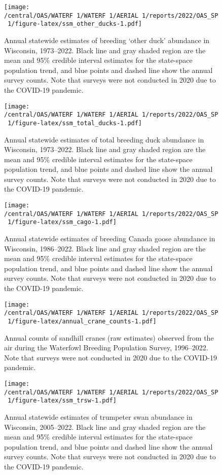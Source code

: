 \documentclass[
  12pt,
]{article}
\begin{document}
\newpage

\begin{figure}
\centering
\texttt{[image: /central/OAS/WATERF~1/WATERF~1/AERIAL~1/reports/2022/OAS\_SP~1/figure-latex/ssm\_other\_ducks-1.pdf]}
\caption{\label{fig:ssm_other_ducks}Annual statewide estimates of
breeding `other duck' abundance in Wisconsin, 1973--2022. Black line and
gray shaded region are the mean and 95\% credible interval estimates for
the state-space population trend, and blue points and dashed line show
the annual survey counts. Note that surveys were not conducted in 2020
due to the COVID-19 pandemic.}
\end{figure}

\newpage

\begin{figure}
\centering
\texttt{[image: /central/OAS/WATERF~1/WATERF~1/AERIAL~1/reports/2022/OAS\_SP~1/figure-latex/ssm\_total\_ducks-1.pdf]}
\caption{\label{fig:ssm_total_ducks}Annual statewide estimates of total
breeding duck abundance in Wisconsin, 1973--2022. Black line and gray
shaded region are the mean and 95\% credible interval estimates for the
state-space population trend, and blue points and dashed line show the
annual survey counts. Note that surveys were not conducted in 2020 due
to the COVID-19 pandemic.}
\end{figure}

\newpage

\begin{figure}
\centering
\texttt{[image: /central/OAS/WATERF~1/WATERF~1/AERIAL~1/reports/2022/OAS\_SP~1/figure-latex/ssm\_cago-1.pdf]}
\caption{\label{fig:ssm_cago}Annual statewide estimates of breeding
Canada goose abundance in Wisconsin, 1986--2022. Black line and gray
shaded region are the mean and 95\% credible interval estimates for the
state-space population trend, and blue points and dashed line show the
annual survey counts. Note that surveys were not conducted in 2020 due
to the COVID-19 pandemic.}
\end{figure}

\newpage

\begin{figure}
\centering
\texttt{[image: /central/OAS/WATERF~1/WATERF~1/AERIAL~1/reports/2022/OAS\_SP~1/figure-latex/annual\_crane\_counts-1.pdf]}
\caption{\label{fig:annual_crane_counts}Annual counts of sandhill cranes
(raw estimates) observed from the air during the Waterfowl Breeding
Population Survey, 1996--2022. Note that surveys were not conducted in
2020 due to the COVID-19 pandemic.}
\end{figure}

\newpage

\begin{figure}
\centering
\texttt{[image: /central/OAS/WATERF~1/WATERF~1/AERIAL~1/reports/2022/OAS\_SP~1/figure-latex/ssm\_trsw-1.pdf]}
\caption{\label{fig:ssm_trsw}Annual statewide estimates of trumpeter
swan abundance in Wisconsin, 2005--2022. Black line and gray shaded
region are the mean and 95\% credible interval estimates for the
state-space population trend, and blue points and dashed line show the
annual survey counts. Note that surveys were not conducted in 2020 due
to the COVID-19 pandemic.}
\end{figure}
\end{document}
